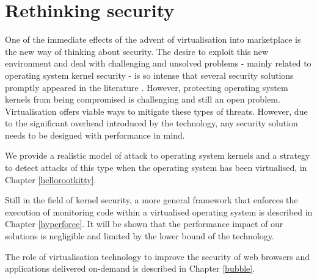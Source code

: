 \section{Rethinking security} \label{rethinking}
One of the immediate effects of the advent of virtualisation into marketplace is the new way of thinking about security. The desire to exploit this new environment and deal with challenging and unsolved problems - mainly related to operating system kernel security - is so intense that several security solutions promptly appeared in the literature \cite{9, hvmharvard, NICKLE, dynamicdatakernel}.      
However, protecting operating system kernels from being compromised is challenging and still an open problem. 
Virtualisation offers viable ways to mitigate these types of threats. However, due to the significant overhead introduced by the technology, any security solution needs to be designed with performance in mind.

We provide a realistic model of attack to operating system kernels and a strategy to detect attacks of this type when the operating system has been virtualised, in Chapter \ref{hellorootkitty}. 

Still in the field of kernel security, a more general framework that enforces the execution of monitoring code within a virtualised operating system is described in Chapter \ref{hyperforce}. 
It will be shown that the performance impact of our solutions is negligible and limited by the lower bound of the technology.

The role of virtualisation technology to improve the security of web browsers and applications delivered on-demand is described in Chapter \ref{bubble}.
